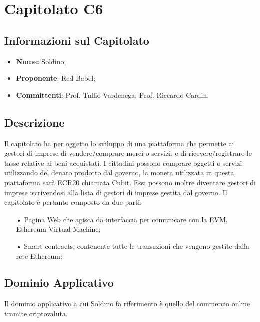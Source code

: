 \section{Capitolato C6}
\subsection{Informazioni sul Capitolato}
\begin{itemize}
	\item \textbf{Nome:} Soldino;
	\item \textbf{Proponente}: Red Babel;
	\item \textbf{Committenti}: Prof. Tullio Vardenega, Prof. Riccardo Cardin.
\end{itemize}

\subsection{Descrizione}
Il capitolato ha per oggetto lo sviluppo di una piattaforma che permette ai gestori di imprese di \newline 
vendere/comprare merci o servizi, e di ricevere/registrare le tasse relative ai beni acquistati.\newline
I cittadini possono comprare oggetti o servizi utilizzando del denaro prodotto dal governo, la moneta utilizzata in questa piattaforma sarà ECR20 chiamata Cubit. Essi possono inoltre diventare gestori di imprese iscrivendosi alla lista di gestori di imprese gestita dal governo.  
Il capitolato è pertanto composto da due parti: 

\begin{itemize}

\item[•] Pagina Web che agisca da interfaccia per comunicare con la EVM, Ethereum Virtual Machine;
\item[•] Smart contracts, contenente tutte le transazioni che vengono gestite dalla rete Ethereum;

\end{itemize}

\subsection{Dominio Applicativo}
Il dominio applicativo a cui Soldino fa riferimento è quello del commercio online tramite criptovaluta. 

